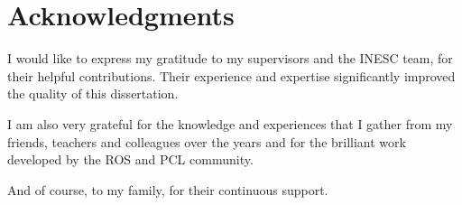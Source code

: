 \chapter*{Acknowledgments}

I would like to express my gratitude to my supervisors and the INESC team, for their helpful contributions. Their experience and expertise significantly improved the quality of this dissertation.

I am also very grateful for the knowledge and experiences that I gather from my friends, teachers and colleagues over the years and for the brilliant work developed by the ROS and PCL community.

And of course, to my family, for their continuous support.

\vspace{10mm}
